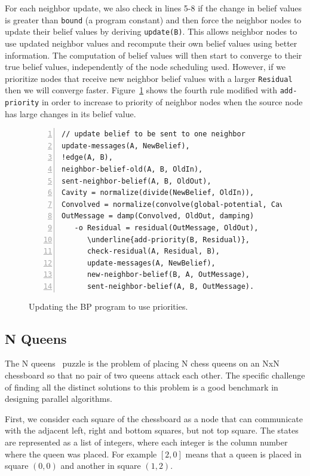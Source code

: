 For each neighbor update, we also check in lines 5-8 if the change in belief
values is greater than \texttt{bound} (a program constant) and then force the
neighbor nodes to update their belief values by deriving \texttt{update(B)}.
This allows neighbor nodes to use updated neighbor values and recompute their
own belief values using better information. The computation of belief values
will then start to converge to their true belief values, independently of the
node scheduling used. However, if we prioritize nodes that receive new neighbor
belief values with a larger \texttt{Residual} then we will converge faster.
Figure~\ref{code:coordination:improved_bp} shows the fourth rule modified with
\texttt{add-priority} in order to increase to priority of neighbor nodes when
the source node has large changes in its belief value.

\begin{figure}[h!]
\begin{Verbatim}[numbers=left,commandchars=\\\{\},fontsize=\scriptsize]
// update belief to be sent to one neighbor
update-messages(A, NewBelief),
!edge(A, B),
neighbor-belief-old(A, B, OldIn),
sent-neighbor-belief(A, B, OldOut),
Cavity = normalize(divide(NewBelief, OldIn)),
Convolved = normalize(convolve(global-potential, Cavity)),
OutMessage = damp(Convolved, OldOut, damping)
   -o Residual = residual(OutMessage, OldOut),
      \underline{add-priority(B, Residual)},
      check-residual(A, Residual, B),
      update-messages(A, NewBelief),
      new-neighbor-belief(B, A, OutMessage),
      sent-neighbor-belief(A, B, OutMessage).
\end{Verbatim}
\caption{Updating the BP program to use priorities.}
\label{code:coordination:improved_bp}
\end{figure}

\subsection{N Queens}

The N queens~\cite{8queens} puzzle is the problem of placing N chess queens on an NxN chessboard so
that no pair of two queens attack each other. The specific challenge of finding all the distinct
solutions to this problem is a good benchmark in designing parallel algorithms.

First, we consider each square of the chessboard as a node
that can communicate with the adjacent left, right and bottom squares, but not top square.
The states are represented as a list of integers, where each integer is the column number where
the queen was placed. For example $[2, 0]$ means that a queen is placed in square $(0, 0)$ and another in square $(1, 2)$.


